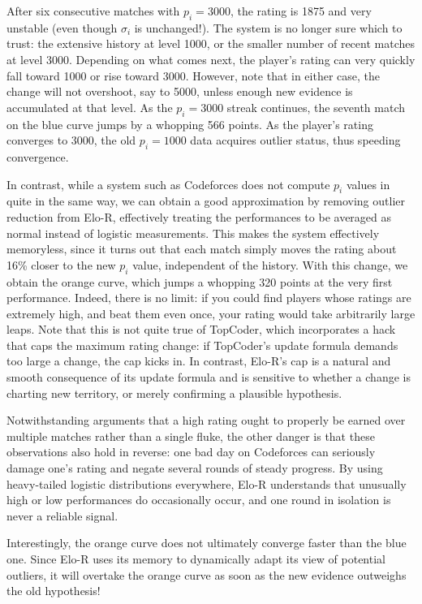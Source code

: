 \documentclass{article}
\begin{document}
After six consecutive matches with $p_i = 3000$, the rating is 1875 and very unstable (even though $\sigma_i$ is unchanged!). The system is no longer sure which to trust: the extensive history at level 1000, or the smaller number of recent matches at level 3000. Depending on what comes next, the player's rating can very quickly fall toward 1000 or rise toward 3000. However, note that in either case, the change will not overshoot, say to 5000, unless enough new evidence is accumulated at that level. As the $p_i=3000$ streak continues, the seventh match on the blue curve jumps by a whopping 566 points. As the player's rating converges to 3000, the old $p_i = 1000$ data acquires outlier status, thus speeding convergence.

In contrast, while a system such as Codeforces does not compute $p_i$ values in quite in the same way, we can obtain a good approximation by removing outlier reduction from Elo-R, effectively treating the performances to be averaged as normal instead of logistic measurements. This makes the system effectively memoryless, since it turns out that each match simply moves the rating about 16\% closer to the new $p_i$ value, independent of the history. With this change, we obtain the orange curve, which jumps a whopping 320 points at the very first performance. Indeed, there is no limit: if you could find players whose ratings are extremely high, and beat them even once, your rating would take arbitrarily large leaps. Note that this is not quite true of TopCoder, which incorporates a hack that caps the maximum rating change: if TopCoder's update formula demands too large a change, the cap kicks in. In contrast, Elo-R's cap is a natural and smooth consequence of its update formula and is sensitive to whether a change is charting new territory, or merely confirming a plausible hypothesis.

Notwithstanding arguments that a high rating ought to properly be earned over multiple matches rather than a single fluke, the other danger is that these observations also hold in reverse: one bad day on Codeforces can seriously damage one's rating and negate several rounds of steady progress. By using heavy-tailed logistic distributions everywhere, Elo-R understands that unusually high or low performances do occasionally occur, and one round in isolation is never a reliable signal.

Interestingly, the orange curve does not ultimately converge faster than the blue one. Since Elo-R uses its memory to dynamically adapt its view of potential outliers, it will overtake the orange curve as soon as the new evidence outweighs the old hypothesis!
\end{document}

